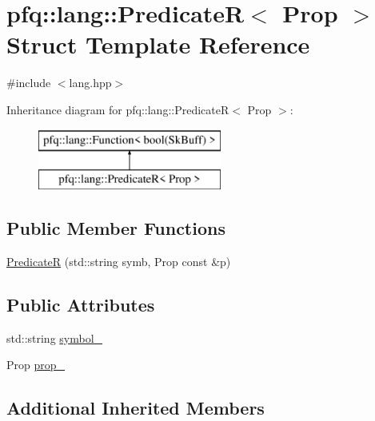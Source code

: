\hypertarget{structpfq_1_1lang_1_1PredicateR}{\section{pfq\+:\+:lang\+:\+:Predicate\+R$<$ Prop $>$ Struct Template Reference}
\label{structpfq_1_1lang_1_1PredicateR}
}


{\ttfamily \#include $<$lang.\+hpp$>$}

Inheritance diagram for pfq\+:\+:lang\+:\+:Predicate\+R$<$ Prop $>$\+:\begin{figure}[H]
\begin{center}
\leavevmode
\includegraphics[height=2.000000cm]{structpfq_1_1lang_1_1PredicateR}
\end{center}
\end{figure}
\subsection*{Public Member Functions}
\begin{DoxyCompactItemize}
\item 
\hyperlink{structpfq_1_1lang_1_1PredicateR_a3e5ca1487bee4cd8b16abff7d101c83f}{Predicate\+R} (std\+::string symb, Prop const \&p)
\end{DoxyCompactItemize}
\subsection*{Public Attributes}
\begin{DoxyCompactItemize}
\item 
std\+::string \hyperlink{structpfq_1_1lang_1_1PredicateR_aaa5566088ceb982f45409c1e0c0a68b9}{symbol\+\_\+}
\item 
Prop \hyperlink{structpfq_1_1lang_1_1PredicateR_adbe1738626a970e7cb7e78b48ff7fa3d}{prop\+\_\+}
\end{DoxyCompactItemize}
\subsection*{Additional Inherited Members}


